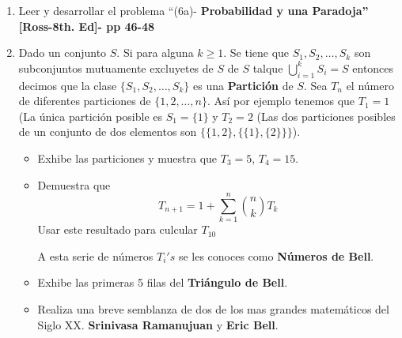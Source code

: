 \documentclass[11pt,letterpaper]{report}
\begin{document}
\begin{enumerate}
\begin{proof}
El primer término en $(4)$ es $P(B) = P(A_{m+1})$. Todo lo que queda es mostrar que $-P(A \cup B)$
es igual a todos, pero el primer término en $(4)$.

Usando la generalización de la propiedad distributiva, para escribir que:
\[
    A \cap B = (\bigcup_{i=1}^m A_i) \cap A_{m+1} = \bigcup_{i=1}^{m} (A_i \cap A_{m+1}) \tag{5}
\]

La unión en $(5)$ contiene $m$ eventos, y por tanto podemos aplicar $(\heartsuit)$ con $n=m$ y cada
$A_i$ reemplazada por $A_i \cap A_{m+1}$. El resultado es que $-P(A \cap B)$ es igual a todos,
excepto el primer término en $(4)$.
\end{proof}


\item Leer y desarrollar el problema ``(6a)- \textbf{Probabilidad y una Paradoja''
[Ross-8th. Ed]- pp 46-48}

\item Dado un conjunto $S$. Si para alguna $k \geq 1$. Se tiene que $S_1, S_2, \ldots, S_k$ son
subconjuntos mutuamente excluyetes de $S$ de $S$ talque $\bigcup_{i=1}^{k} S_i = S$ entonces decimos
que la clase $\{ S_1, S_2, \ldots, S_k \}$ es una \textbf{Partición} de $S$. Sea $T_n$ el número
de diferentes particiones de $\{ 1, 2, \ldots , n \}$. Así por ejemplo tenemos que
$T_1 = 1$ (La única partición posible es $S_1 = \{ 1 \}$ y $T_2 = 2$ (Las dos particiones
posibles de un conjunto de dos elementos son $\{ \{ 1, 2 \}, \{ \{ 1 \}, \{ 2 \} \} \}$).

\begin{itemize}
    \item Exhibe las particiones y muestra que $T_3 = 5$, $T_4 = 15$.
    \item Demuestra que
    \[
        T_{n+1} = 1 + \sum_{k=1}^{n} \binom{n}{k} T_k
    \]
    Usar este resultado para culcular $T_{10}$

    A esta serie de números $T_i's$ se les conoces como \textbf{Números de Bell}.

    \item Exhibe las primeras 5 filas del \textbf{Triángulo de Bell}.
    
    \item Realiza una breve semblanza de dos de los mas grandes matemáticos del Siglo XX.
    \textbf{Srinivasa Ramanujuan} y \textbf{Eric Bell}.


\end{itemize}

    
\end{enumerate}





\end{document}
